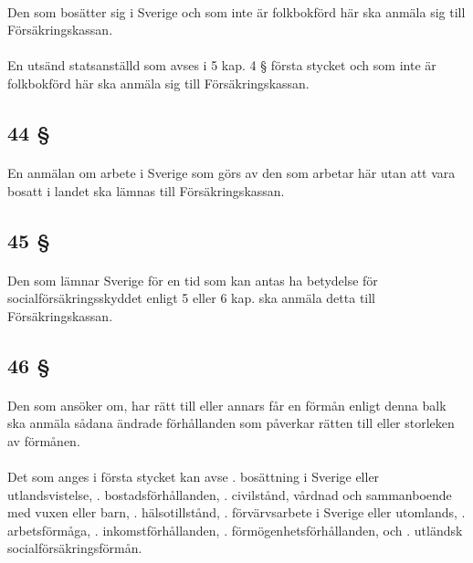 \documentclass[a4paper,notitlepage,openany,10pt]{book}
\begin{document}
\paragraph*{}
Den som bosätter sig i Sverige och som inte är folkbokförd här ska anmäla sig till Försäkringskassan.
\paragraph*{}
En utsänd statsanställd som avses i 5 kap. 4 § första stycket och som inte är folkbokförd här ska anmäla sig till Försäkringskassan.
\subsection*{44 §}
\paragraph*{}
En anmälan om arbete i Sverige som görs av den som arbetar här utan att vara bosatt i landet ska lämnas till Försäkringskassan.
\subsection*{45 §}
\paragraph*{}
Den som lämnar Sverige för en tid som kan antas ha betydelse för socialförsäkringsskyddet enligt 5 eller 6 kap.
ska anmäla detta till Försäkringskassan.
\subsection*{46 §}
\paragraph*{}
Den som ansöker om, har rätt till eller annars får en förmån enligt denna balk ska anmäla sådana ändrade förhållanden som påverkar rätten till eller storleken av förmånen.
\paragraph*{}
Det som anges i första stycket kan avse
. bosättning i Sverige eller utlandsvistelse,
. bostadsförhållanden,
. civilstånd, vårdnad och sammanboende med vuxen eller barn,
. hälsotillstånd,
. förvärvsarbete i Sverige eller utomlands,
. arbetsförmåga,
. inkomstförhållanden,
. förmögenhetsförhållanden, och
. utländsk socialförsäkringsförmån.
\end{document}
